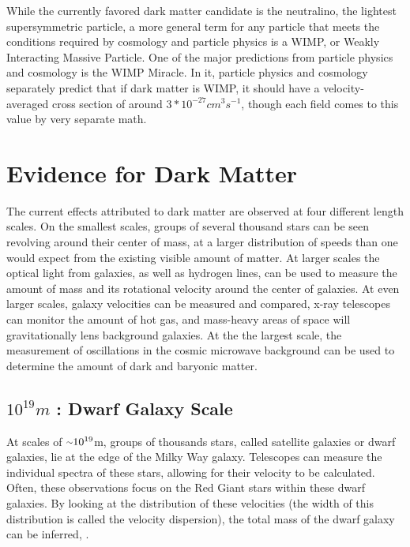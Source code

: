 While the currently favored dark matter candidate is the neutralino, the lightest supersymmetric particle, a more general term for any particle that meets the conditions required by cosmology and particle physics is a WIMP, or Weakly Interacting Massive Particle.
One of the major predictions from particle physics and cosmology is the WIMP Miracle.
In it, particle physics and cosmology separately predict that if dark matter is WIMP, it should have a velocity-averaged cross section of around $3*10^{-27}cm^{3}s^{-1}$, though each field comes to this value by very separate math.



\section{Evidence for Dark Matter}

The current effects attributed to dark matter are observed at four different length scales.
On the smallest scales, groups of several thousand stars can be seen revolving around their center of mass, at a larger distribution of speeds than one would expect from the existing visible amount of matter.
At larger scales the optical light from galaxies, as well as hydrogen lines, can be used to measure the amount of mass and its rotational velocity around the center of galaxies.
At even larger scales, galaxy velocities can be measured and compared, x-ray telescopes can monitor the amount of hot gas, and mass-heavy areas of space will gravitationally lens background galaxies.
At the the largest scale, the measurement of oscillations in the cosmic microwave background can be used to determine the amount of dark and baryonic matter.

\subsection{$10^{19}m$ : Dwarf Galaxy Scale}
At scales of $\nicetilde 10^{19}$m, groups of thousands stars, called satellite galaxies or dwarf galaxies, lie at the edge of the Milky Way galaxy.
Telescopes can measure the individual spectra of these stars, allowing for their velocity to be calculated.
Often, these observations focus on the Red Giant stars within these dwarf galaxies\cite{dwarf_gal_red_giant}.
By looking at the distribution of these velocities (the width of this distribution is called the velocity dispersion), the total mass of the dwarf galaxy can be inferred\cite{dwarf_gal_vel_dispersion}, \cite{dwarf_gal_vel_dispersion2}.

